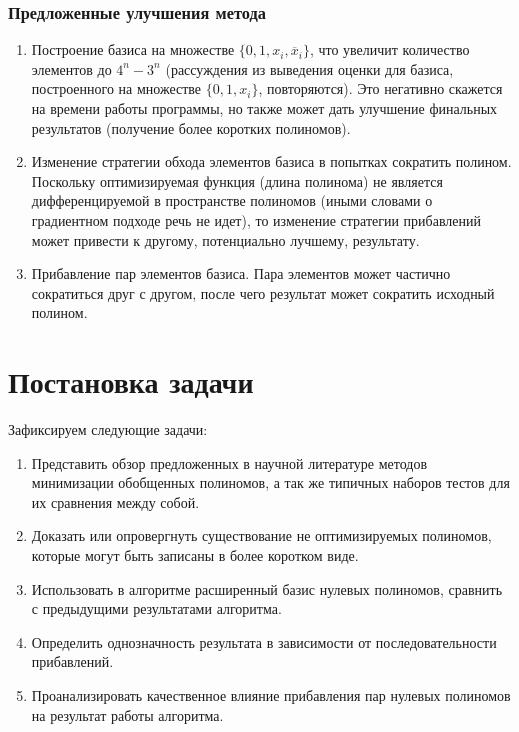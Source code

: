 \documentclass[a4paper,12pt,titlepage,finall]{article}
\begin{document}
\subsubsection{Предложенные улучшения метода}

\begin{enumerate}
    \item Построение базиса на множестве $ \{ 0, 1, x_i, \overline x_i \} $, что увеличит количество элементов до $ 4^n - 3^n $ (рассуждения из выведения оценки для базиса, построенного на множестве $ \{ 0, 1, x_i \} $, повторяются). Это негативно скажется на времени работы программы, но также может дать улучшение финальных результатов (получение более коротких полиномов).
    \item Изменение стратегии обхода элементов базиса в попытках сократить полином. Поскольку оптимизируемая функция (длина полинома) не является дифференцируемой в пространстве полиномов (иными словами о градиентном подходе речь не идет), то изменение стратегии прибавлений может привести к другому, потенциально лучшему, результату.
    \item Прибавление пар элементов базиса. Пара элементов может частично сократиться друг с другом, после чего результат может сократить исходный полином.
\end{enumerate}

\newpage

\section{Постановка задачи}

Зафиксируем следующие задачи:
\begin{enumerate}
    \item Представить обзор предложенных в научной литературе методов минимизации обобщенных полиномов, а так же типичных наборов тестов для их сравнения между собой.
    \item Доказать или опровергнуть существование не оптимизируемых полиномов, которые могут быть записаны в более коротком виде.
    \item Использовать в алгоритме расширенный базис нулевых полиномов, сравнить с предыдущими результатами алгоритма.
    \item Определить однозначность результата в зависимости от последовательности прибавлений.
    \item Проанализировать качественное влияние прибавления пар нулевых полиномов на результат работы алгоритма.
\end{enumerate}
\end{document}
